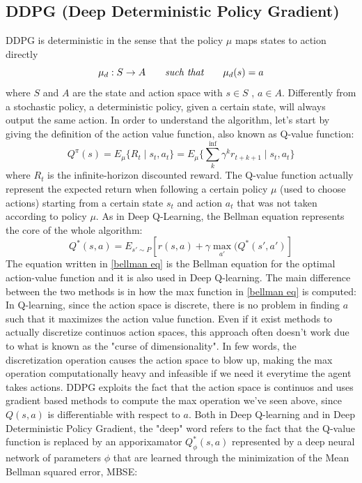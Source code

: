 \documentclass[a4paper]{report}
\begin{document}
\subsection{DDPG (Deep Deterministic Policy Gradient)}
DDPG is deterministic in the sense that the policy $\mu $ maps states to action directly
\begin{equation}
\mu_d : S \rightarrow A \qquad \emph{such that} \qquad \mu_d(s) = a
\end{equation}
where $ S $ and $ A $ are the state and action space with $ s \in S$ , $a \in A$. Differently from a stochastic policy,  a deterministic policy, given a certain state, will always output the same action.
In order to understand  the algorithm, let's start by giving the definition of the action value function, also known as Q-value function:
\begin{equation}
Q^{\pi}(s) = E_{\mu} \{R_t \mid s_t, a_t  \} =  E_{\mu} \{\sum_{k}^{\inf} \gamma^k r_{t+k+1} \mid s_t, a_t  \}
\end{equation}
where $R_t$ is the infinite-horizon discounted reward. The Q-value function actually represent the expected return when following a certain policy $\mu$ (used to choose actions) starting from a certain state $s_t$ and action $a_t$ that was not taken according to policy $\mu$.
As in Deep Q-Learning, the Bellman equation represents the core of the whole algorithm:
\begin{equation} \label{bellman eq}
Q^*(s,a)=E_{s'\sim P} [r(s,a) + \gamma \max_{a'}(Q^*(s',a')]
\end{equation} 
The equation written in \ref{bellman eq} is the Bellman equation for the optimal action-value function and it is also used in Deep Q-learning. The main difference between the two methods is in how the max function in \ref{bellman eq} is computed: In Q-learning, since the action space is discrete, there is no problem in finding $a$ such that it maximizes the action value function. Even if it exist methods to actually discretize continuos action spaces, this approach often doesn't work due to what is known as the "curse of dimensionality". In few words, the discretization operation causes the action space to blow up, making the max operation computationally heavy and infeasible if we need it everytime the agent takes actions. DDPG exploits the fact that the action space is continuos and uses gradient based methods to compute the max operation we've seen above, since $Q(s,a)$ is differentiable with respect to $a$. Both in Deep Q-learning and in Deep Deterministic Policy Gradient, the "deep" word refers to the fact that the Q-value function is replaced by an apporixamator $Q_{\phi}^{*}(s,a)$ represented by a deep neural network of parameters $\phi$ that are learned through the minimization of the Mean Bellman squared error, MBSE:
\end{document}
